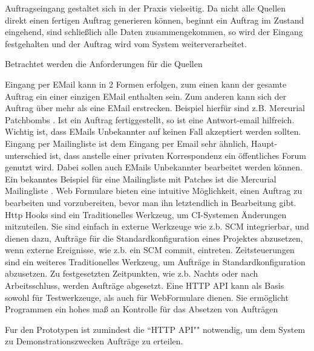 Auftragseingang gestaltet sich in der Praxis vielseitig.
Da nicht alle Quellen direkt einen fertigen Auftrag generieren können,
beginnt ein Auftrag im Zustand eingehend, sind schließlich alle Daten zusammengekommen,
so wird der Eingang festgehalten und der Auftrag wird vom System weiterverarbeitet.

Betrachtet werden die Anforderungen für die Quellen
\begin{description}
    \dhitem[EMail]
        Eingang per EMail kann in 2 Formen erfolgen,
        zum einen kann der gesamte Auftrag ein einer einzigen EMail enthalten sein.
        Zum anderen kann sich der Auftrag über mehr als eine EMail erstrecken.
        Beispiel hierfür sind z.B. Mercurial Patchbombs \cite{mercurial:patchbomb}.
        Ist ein Auftrag fertiggestellt, so ist eine Antwort-email hilfreich.
        Wichtig ist, dass EMails Unbekannter auf keinen Fall
        akzeptiert werden sollten.
    \dhitem[Mailingliste]
        Eingang per Mailingliste ist dem Eingang per Email sehr ähnlich,
        Haupt-unterschied ist, dass anstelle einer privaten Korrespondenz
        ein öffentliches Forum genutzt wird. Dabei sollen auch EMails Unbekannter 
        bearbeitet werden können.
        Ein bekanntes Beispiel für eine Mailingliste mit Patches
        ist die Mercurial Mailingliste \cite{mercurial:mailingliste}.
        Web Formulare bieten eine intuitive Möglichkeit,
        einen Auftrag zu bearbeiten und vorzubereiten,
        bevor man ihn letztendlich in Bearbeitung gibt.
        Http Hooks sind ein Traditionelles Werkzeug,
        um CI-Systemen Änderungen mitzuteilen.
        Sie sind einfach in externe Werkzeuge wie z.b. SCM integrierbar,
        und dienen dazu, Aufträge für die Standardkonfiguration
        eines Projektes abzusetzen, wenn externe Ereignisse,
        wie z.b. ein SCM commit, eintreten.
    \dhitem[Zeitsteuerung]
        Zeitsteuerungen sind ein weiteres Traditionelles Werkzeug,
        um Aufträge in Standardkonfiguration abzusetzen.
        Zu festgesetzten Zeitpunkten, wie z.b. Nachts oder nach
        Arbeitsschluss, werden Aufträge abgesetzt.
        Eine HTTP API kann als Basis sowohl für Testwerkzeuge,
        als auch für WebFormulare dienen.
        Sie ermöglicht Programmen ein hohes maß an Kontrolle
        für das Absetzen von Aufträgen
\end{description}

Fur den Prototypen ist zumindest die ``HTTP API"" notwendig,
um dem System zu Demonstrationszwecken Aufträge zu erteilen.


